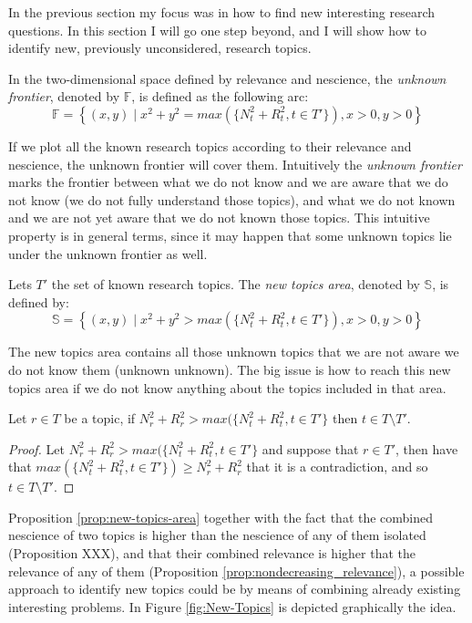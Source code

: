 In the previous section my focus was in how to find new interesting research questions. In this section I will go one step beyond, and I will show how to identify new, previously unconsidered, research topics.

\begin{definition}
In the two-dimensional space defined by relevance and nescience, the \textit{unknown frontier}, denoted by $\mathbb{F}$, is defined as the following arc:
\[
\mathbb{F} = \left\{(x,y) \mid x^{2}+y^{2}=max(\{N^2_{t} + R^2_{t}, t \in T'\}),x>0,y>0\right\} 
\]
\end{definition}

If we plot all the known research topics according to their relevance and nescience, the unknown frontier will cover them. Intuitively the \emph{unknown frontier} marks the frontier between what we do not know and we are aware that we do not know (we do not fully understand those topics), and what we do not known and we are not yet aware that we do not known those topics. This intuitive property is in general terms, since it may happen that some unknown topics lie under the unknown frontier as well.

\begin{definition}
Lets $T'$ the set of known research topics. The \emph{new topics area}, denoted by $\mathbb{S}$, is defined by:
\[
\mathbb{S} = \left\{(x,y) \mid x^{2}+y^{2}>max(\{N^2_{t} + R^2_{t}, t \in T'\}),x>0,y>0\right\} 
\]
\end{definition}

The new topics area contains all those unknown topics that we are not aware we do not know them (unknown unknown). The big issue is how to reach this new topics area if we do not know anything about the topics included in that area.

\begin{proposition}
\label{prop:new-topics-area}
Let $r \in T$ be a topic, if  $N^2_{r} + R^2_{r} > max(\{N^2_{t} + R^2_{t}, t \in T'\}$ then $t \in T \setminus T'$.
\end{proposition}
\begin{proof}
Let $N^2_{r} + R^2_{r} > max(\{N^2_{t} + R^2_{t}, t \in T'\}$ and suppose that $r \in T'$, then have that $max(\{N^2_{t} + R^2_{t}, t \in T'\}) \geq N^2_{r} + R^2_{r}$ that it is a contradiction, and so $t \in T \setminus T'$.
\end{proof}

Proposition \ref{prop:new-topics-area} together with the fact that the combined nescience of two topics is higher than the nescience of any of them isolated (Proposition {\color{red} XXX}), and that their combined relevance is higher that the relevance of any of them (Proposition \ref{prop:nondecreasing_relevance}), a possible approach to identify new topics could be by means of combining already existing interesting problems. In Figure \ref{fig:New-Topics} is depicted graphically the idea.

